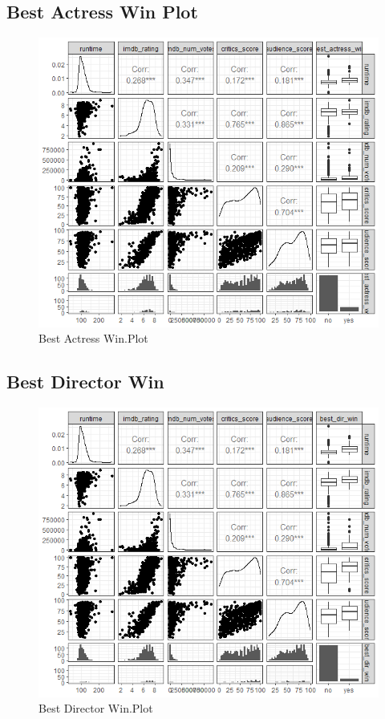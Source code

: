 \documentclass[12pt,letterpaper]{article}
\begin{document}
	\vspace{1cm}
\newpage


\subsection*{Best Actress Win Plot}

\begin{figure}[h!]\centering
	\caption{\footnotesize Best Actress Win.Plot }
	\label{fig:plot_3}
	\includegraphics[width=.75\textwidth]{best actress 2.png}
\end{figure}

	\vspace{1cm}
	
	\newpage
	
\subsection*{Best Director Win}

\begin{figure}[h!]\centering
	\caption{\footnotesize Best Director Win.Plot }
	\label{fig:plot_4}
	\includegraphics[width=.75\textwidth]{best dir 2.png}
\end{figure}
\end{document}
